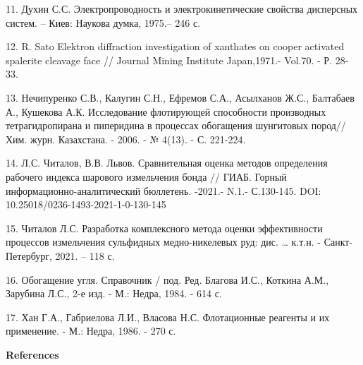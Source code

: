 \begin{noparindent}
11. Духин С.С. Электропроводность и электрокинетические свойства
дисперсных систем. -- Киев: Наукова думка, 1975.-- 246 с.

12. R. Sato Elektron diffraction investigation of xanthates on cooper
activated spalerite cleavage face // Journal Mining Institute
Japan,1971.- Vol.70. - Р. 28-33.

13. Нечипуренко С.В., Калугин С.Н., Ефремов С.А., Асылханов Ж.С.,
Балтабаев А., Кушекова А.К. Исследование флотирующей способности
производных тетрагидропирана и пиперидина в процессах обогащения
шунгитовых пород// Хим. журн. Казахстана. - 2006. - № 4(13). - С.
221-224.

14. Л.С. Читалов, В.В. Львов. Сравнительная оценка методов определения
рабочего индекса шарового измельчения бонда // ГИАБ. Горный
информационно-аналитический бюллетень. -2021.- N.1.- С.130-145. DOI:
10.25018/0236-1493-2021-1-0-130-145

15. Читалов Л.С. Разработка комплексного метода оценки эффективности
процессов измельчения сульфидных медно-никелевых руд: дис. \ldots{}
к.т.н. - Санкт-Петербург, 2021. -- 118 с.

16. Обогащение угля. Справочник / под. Ред. Благова И.С., Коткина А.М.,
Зарубина Л.С., 2-е изд. - М.: Недра, 1984. - 614 с.

17. Хан Г.А., Габриелова Л.И., Власова Н.С. Флотационные реагенты и их
применение. - М.: Недра, 1986. - 270 с.
\end{noparindent}

\begin{center}
{\bfseries References}
\end{center}

